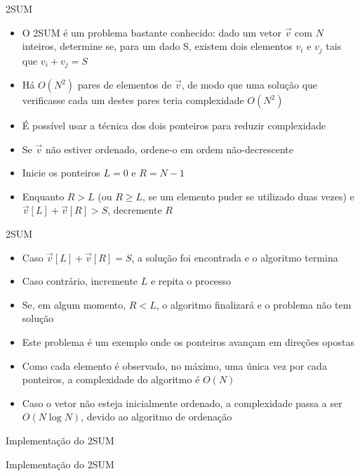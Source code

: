 \begin{frame}[fragile]{2SUM}

    \begin{itemize}
        \item O 2SUM é um problema bastante conhecido: dado um vetor $\vec{v}$ com $N$ inteiros,
            determine se, para um dado S, existem dois elementos $v_i$ e $v_j$ tais que 
            $v_i + v_j = S$

        \item Há $O(N^2)$ pares de elementos de $\vec{v}$, de modo que uma solução que verificasse
            cada um destes pares teria complexidade $O(N^2)$

        \item É possível usar a técnica dos dois ponteiros para reduzir complexidade

        \item Se $\vec{v}$ não estiver ordenado, ordene-o em ordem não-decrescente

        \item Inicie os ponteiros $L = 0$ e $R = N - 1$

        \item Enquanto $R > L$ (ou $R\geq L$, se um elemento puder se utilizado duas vezes) e
            $\vec{v}[L] + \vec{v}[R] > S$, decremente $R$

    \end{itemize}

\end{frame}

\begin{frame}[fragile]{2SUM}

    \begin{itemize}
        \item Caso $\vec{v}[L] + \vec{v}[R] = S$, a solução foi encontrada e o algoritmo
            termina

        \item Caso contrário, incremente $L$ e repita o processo

        \item Se, em algum momento, $R < L$, o algoritmo finalizará
            e o problema não tem solução

        \item Este problema é um exemplo onde os ponteiros avançam em direções opostas

        \item Como cada elemento é observado, no máximo, uma única vez por cada ponteiros, a
            complexidade do algoritmo é $O(N)$

        \item Caso o vetor não esteja inicialmente ordenado, a complexidade passa a ser
            $O(N\log N)$, devido ao algoritmo de ordenação
    \end{itemize}

\end{frame}

\begin{frame}[fragile]{Implementação do 2SUM}
\end{frame}

\begin{frame}[fragile]{Implementação do 2SUM}
\end{frame}
